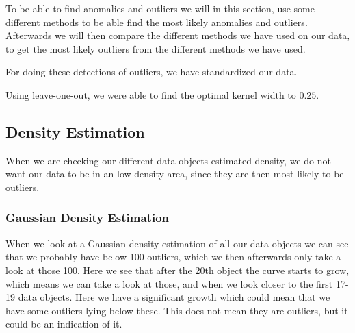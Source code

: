 To be able to find anomalies and outliers we will in this section, use some different methods to be able find the most likely anomalies and outliers. Afterwards we will then compare the different methods we have used on our data, to get the most likely outliers from the different methods we have used.

For doing these detections of outliers, we have standardized our data.

Using leave-one-out, we were able to find the optimal kernel width to $0.25$.

\subsection{Density Estimation}

When we are checking our different data objects estimated density, we do not want our data to be in an low density area, since they are then most likely to be outliers.

\subsubsection{Gaussian Density Estimation}

When we look at a Gaussian density estimation of all our data objects we can see that we probably have below 100 outliers, which we then afterwards only take a look at those 100. Here we see that after the 20th object the curve starts to grow, which means we can take a look at those, and when we look closer to the first 17-19 data objects. Here we have a significant growth which could mean that we have some outliers lying below these. This does not mean they are outliers, but it could be an indication of it.

